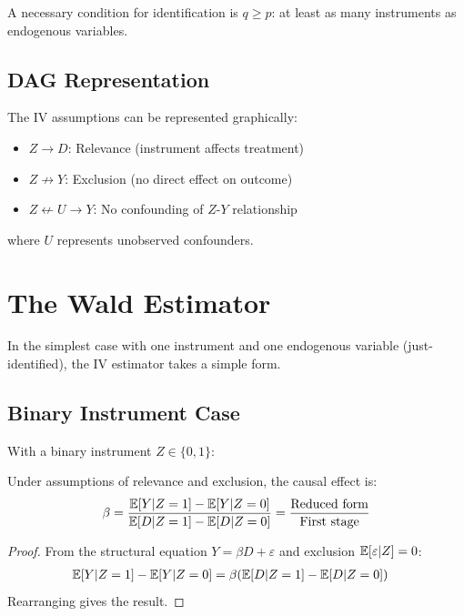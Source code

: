 \begin{proposition}
A necessary condition for identification is $q \geq p$: at least as many instruments as endogenous variables.
\end{proposition}

\subsection{DAG Representation}

The IV assumptions can be represented graphically:
\begin{itemize}
    \item $Z \rightarrow D$: Relevance (instrument affects treatment)
    \item $Z \not\rightarrow Y$: Exclusion (no direct effect on outcome)
    \item $Z \not\leftarrow U \rightarrow Y$: No confounding of $Z$-$Y$ relationship
\end{itemize}

where $U$ represents unobserved confounders.


\section{The Wald Estimator}
\label{sec:iv_wald}

In the simplest case with one instrument and one endogenous variable (just-identified), the IV estimator takes a simple form.

\subsection{Binary Instrument Case}

With a binary instrument $Z \in \{0, 1\}$:

\begin{theorem}
\label{thm:wald}
Under assumptions of relevance and exclusion, the causal effect is:
\begin{equation}
\beta = \frac{\mathbb{E}[Y | Z=1] - \mathbb{E}[Y | Z=0]}{\mathbb{E}[D | Z=1] - \mathbb{E}[D | Z=0]} = \frac{\text{Reduced form}}{\text{First stage}}
\label{eq:wald}
\end{equation}
\end{theorem}

\begin{proof}
From the structural equation $Y = \beta D + \varepsilon$ and exclusion $\mathbb{E}[\varepsilon | Z] = 0$:
\begin{align}
\mathbb{E}[Y | Z=1] - \mathbb{E}[Y | Z=0] &= \beta(\mathbb{E}[D | Z=1] - \mathbb{E}[D | Z=0])
\end{align}
Rearranging gives the result.
\end{proof}

